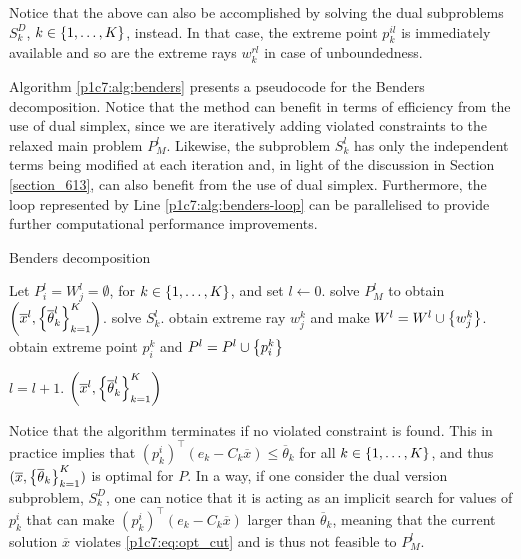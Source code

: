 Notice that the above can also be accomplished by solving the dual subproblems $S^D_k$, $k \in \left\{ 1, \dots, K \right \}$, instead. In that case, the extreme point $p^{il}_k$ is immediately available and so are the extreme rays $w^{rl}_k$ in case of unboundedness.

Algorithm \ref{p1c7:alg:benders} presents a pseudocode for the Benders decomposition. Notice that the method can benefit in terms of efficiency from the use of dual simplex, since we are iteratively adding violated constraints to the relaxed main problem $P_M^l$. Likewise, the subproblem $S_k^l$ has only the independent terms being modified at each iteration and, in light of the discussion in Section \ref{section_613}, can also benefit from the use of dual simplex. Furthermore, the loop represented by Line \ref{p1c7:alg:benders-loop} can be parallelised to provide further computational performance improvements. 

\begin{algorithm}[H]
    \caption{Benders decomposition} \label{p1c7:alg:benders}
    \begin{algorithmic}[1] %
    Let $P_i^l = W_j^l = \emptyset$, for $k \in \left\{ 1,\dots,K \right \}$, and set
    $l \gets 0$. 
    \Repeat 
        \State solve $P_M^l$ to obtain $\left(\overline{x}^l, \left\{ \overline{\theta}_k^l \right \}_{k=1}^K\right)$. 
         \label{p1c7:alg:benders-loop}
            \State solve $S_k^l$.
            	\State obtain extreme ray $w_j^k$ and make $W^l = W^l \cup \left\{ w_j^k \right \}$.
            \Else
            	\State obtain extreme point $p_i^k$ and $P^l = P^l \cup \left\{ p_i^k \right \}$
            \EndIf  
        \EndFor
 
        \State $l = l + 1$.        	
     $\left(\overline{x}^l, \left\{ \overline{\theta}_k^l \right \}_{k=1}^K\right)$
  \end{algorithmic}
\end{algorithm}

Notice that the algorithm terminates if no violated constraint is found. This in practice implies that $(p^i_k)^\top(e_k - C_k \overline{x}) \leq \overline{\theta}_k$ for all $k \in \left\{ 1,\dots,K \right \}$, and thus $(\overline{x}, \left\{ \overline{\theta}_k \right \}_{k=1}^K)$ is optimal for $P$. In a way, if one consider the dual version subproblem, $S_k^D$, one can notice that it is acting as an implicit search for values of $p^i_k$ that can make $(p^i_k)^\top(e_k - C_k \overline{x})$ larger than $\overline{\theta}_k$, meaning that the current solution $\overline{x}$ violates \ref{p1c7:eq:opt_cut} and is thus not feasible to $P_M^l$. 


